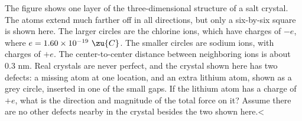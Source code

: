 The figure shows one layer of the three-dimensional
structure of a salt crystal. The atoms extend much farther
off in all directions, but only a six-by-six square is shown
here. The larger circles are the chlorine ions, which have
charges of $-e$, where $e=1.60\times10^{-19}\ \zu{C}$. The smaller circles are sodium ions, with
charges of $+e$. The center-to-center distance between
neighboring ions is about 0.3 nm. Real crystals are never
perfect, and the crystal shown here has two defects: a
missing atom at one location, and an extra lithium atom,
shown as a grey circle, inserted in one of the small gaps.
If the lithium atom has a charge of $+e$, what is the
direction and magnitude of the total force on it? Assume
there are no other defects nearby in the crystal besides the
two shown here.<%
